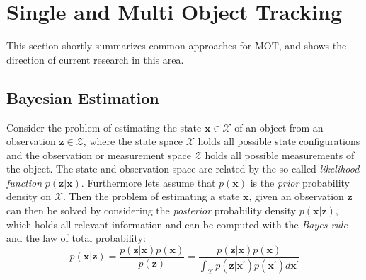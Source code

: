 \documentclass[12pt,a4paper]{article}
\begin{document}







\section{Single and Multi Object Tracking}
This section shortly summarizes common approaches for MOT, and shows the direction of current research in this area. 

\subsection{Bayesian Estimation}
\label{bayesian_estimation}

Consider the problem of estimating the state $\mathbf{x} \in \mathcal{X}$ of an object from an observation $\mathbf{z} \in \mathcal{Z}$, where the state space $\mathcal{X}$ holds all possible state configurations and the observation or measurement space $\mathcal{Z}$ holds all possible measurements of the object. The state and observation space are related by the so called \emph{likelihood function} $p(\mathbf{z} | \mathbf{x})$. Furthermore lets assume that $p(\mathbf{x})$ is the \emph{prior} probability density on $\mathcal{X}$. Then the problem of estimating a state $\mathbf{x}$, given an observation $\mathbf{z}$ can then be solved by considering the \emph{posterior} probability density $p(\mathbf{x} | \mathbf{z})$, which holds all relevant information and can be computed with the \emph{Bayes rule} and the law of total probability:
$$
p(\mathbf{x}|\mathbf{z}) = \frac{p(\mathbf{z}|\mathbf{x})p(\mathbf{x})}{p(\mathbf{z})} =  \frac{p(\mathbf{z}|\mathbf{x})p(\mathbf{x})}{ \int_{\mathcal{X}} p(\mathbf{z}|\mathbf{x}^\prime)p(\mathbf{x}^\prime)d\mathbf{x}^\prime}
$$
\end{document}
